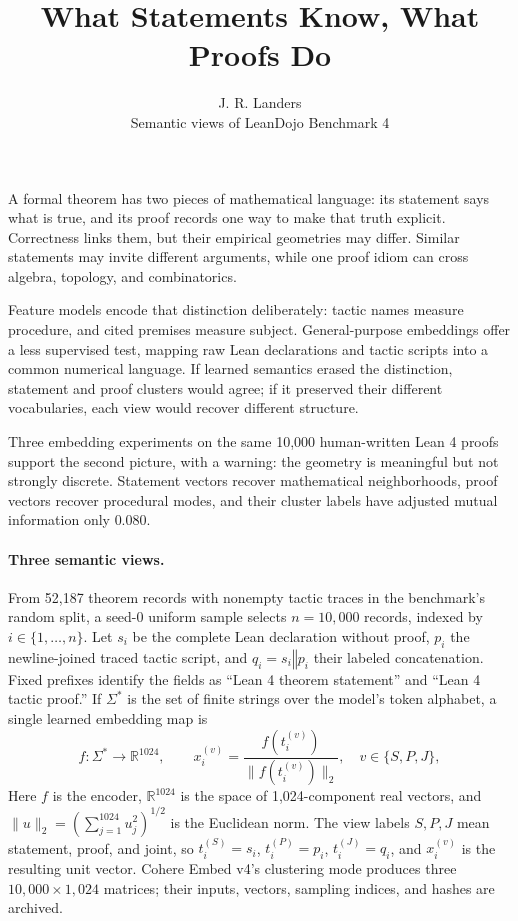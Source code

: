 \documentclass[11pt]{article}
\title{\vspace{-1.6em}\textbf{What Statements Know, What Proofs Do}\vspace{-0.5em}}
\author{J. R. Landers\\[-1pt]\small Semantic views of LeanDojo Benchmark 4}
\date{\vspace{-1.2em}}
\begin{document}
\maketitle
\vspace{-1.6em}

A formal theorem has two pieces of mathematical language: its statement says what is true, and
its proof records one way to make that truth explicit.  Correctness links them, but their empirical
geometries may differ.  Similar statements may invite different arguments, while one proof idiom
can cross algebra, topology, and combinatorics.

Feature models encode that distinction deliberately: tactic names measure procedure, and cited
premises measure subject.  General-purpose embeddings offer a less supervised test, mapping raw
Lean declarations and tactic scripts into a common numerical language.  If learned semantics
erased the distinction, statement and proof clusters would agree; if it preserved their different
vocabularies, each view would recover different structure.

Three embedding experiments on the same 10,000 human-written Lean 4 proofs support the second
picture, with a warning: the geometry is meaningful but not strongly discrete.  Statement vectors
recover mathematical neighborhoods, proof vectors recover procedural modes, and their cluster
labels have adjusted mutual information only $0.080$.

\paragraph{Three semantic views.}
From 52,187 theorem records with nonempty tactic traces in the benchmark's random split, a seed-0
uniform sample selects $n=10{,}000$ records, indexed by $i\in\{1,\ldots,n\}$.  Let $s_i$ be
the complete Lean declaration without proof, $p_i$ the newline-joined traced tactic script, and
$q_i=s_i\mathbin\Vert p_i$ their labeled concatenation.  Fixed prefixes identify the fields as
``Lean 4 theorem statement'' and ``Lean 4 tactic proof.''  If $\Sigma^*$ is the set of finite
strings over the model's token alphabet, a single learned embedding map is
\[
 f:\Sigma^*\longrightarrow\mathbb{R}^{1024},\qquad
 x_i^{(v)}=\frac{f(t_i^{(v)})}{\lVert f(t_i^{(v)})\rVert_2},
 \quad v\in\{S,P,J\},
\]
Here $f$ is the encoder, $\mathbb{R}^{1024}$ is the space of 1,024-component real vectors, and
$\lVert u\rVert_2=(\sum_{j=1}^{1024}u_j^2)^{1/2}$ is the Euclidean norm.  The view labels $S,P,J$
mean statement, proof, and joint, so $t_i^{(S)}=s_i$, $t_i^{(P)}=p_i$, $t_i^{(J)}=q_i$, and
$x_i^{(v)}$ is the resulting unit vector.  Cohere Embed v4's clustering mode produces
three $10{,}000\times1{,}024$ matrices; their inputs, vectors, sampling indices, and hashes are archived.
\end{document}
